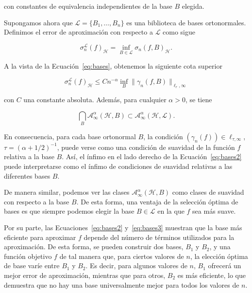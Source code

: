 con constantes de equivalencia independientes de la base $B$ elegida.\newline

Supongamos ahora que $\mathcal{L} = \{ B_1, \ldots, B_n \}$ es una biblioteca de bases ortonormales. Definimos el error de aproximación con respecto a $\mathcal{L}$ como sigue

\[
    \sigma_n^{\mathcal{L}}(f)_{\mathcal{H}} = \inf_{B \in \mathcal{L}} \sigma_n(f, B)_{\mathcal{H}}.
\]

A la vista de la Ecuación~\eqref{eq:bases}, obtenemos la siguiente cota superior

\begin{equation}\label{eq:bases2}
    \sigma_n^{\mathcal{L}}(f)_{\mathcal{H}} \leq C n^{-\alpha} \inf_{B} \| \gamma_n(f, B) \|_{\ell_r, \infty}
\end{equation}

con $C$ una constante absoluta. Además, para cualquier $\alpha > 0$, se tiene

\begin{equation}\label{eq:bases3}
    \bigcap_{B} \mathcal{A}_\infty^\alpha (\mathcal{H}, B) \subset \mathcal{A}_\infty^\alpha (\mathcal{H}, \mathcal{L}).
\end{equation}

En consecuencia, para cada base ortonormal $B$, la condición $(\gamma_n(f)) \in \ell_{\tau, \infty}$, $\tau = (\alpha + 1/2)^{-1}$, puede verse como una condición de suavidad de la función $f$ relativa a la base $B$. Así, el ínfimo en el lado derecho de la Ecuación~\eqref{eq:bases2} puede interpretarse como el ínfimo de condiciones de suavidad relativas a las diferentes bases $B$.\newline

De manera similar, podemos ver las clases $\mathcal{A}_\infty^\alpha (\mathcal{H}, B)$ como clases de suavidad con respecto a la base $B$. De esta forma, una ventaja de la selección óptima de bases es que siempre podemos elegir la base $B \in \mathcal{L}$ en la que $f$ sea más suave.\newline

Por su parte, las Ecuaciones~\eqref{eq:bases2} y~\eqref{eq:bases3} muestran que la base más eficiente para aproximar $f$ depende del número de términos utilizados para la aproximación. De esta forma, se pueden construir dos bases, $B_1$ y $B_2$, y una función objetivo $f$ de tal manera que, para ciertos valores de $n$, la elección óptima de base varíe entre $B_1$ y $B_2$. Es decir, para algunos valores de $n$, $B_1$ ofrecerá un mejor error de aproximación, mientras que para otros, $B_2$ es más eficiente, lo que demuestra que no hay una base universalmente mejor para todos los valores de $n$.\newline

